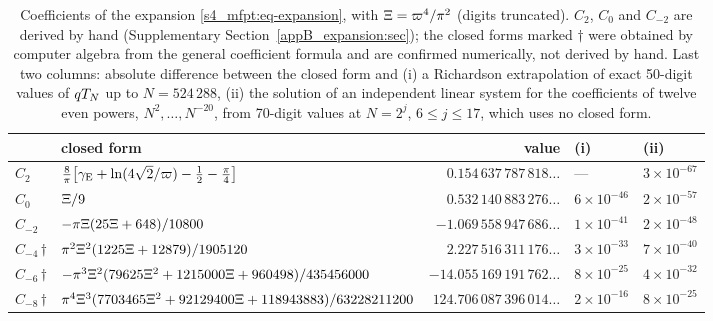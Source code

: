 \begin{table}[htb]
\centering\footnotesize\setlength{\tabcolsep}{3.5pt}
\caption{Coefficients of the expansion \eqref{s4_mfpt:eq-expansion}, with $\Xi=\varpi^{4}/\pi^{2}$ (digits
truncated). $C_{2}$, $C_{0}$ and $C_{-2}$ are derived by hand (Supplementary Section~\ref{appB_expansion:sec}); the closed
forms marked $\dagger$ were obtained by computer algebra from the general coefficient formula and are confirmed
numerically, not derived by hand. Last two columns: absolute difference between the closed form and (i) a Richardson
extrapolation of exact 50-digit values of $qT_{N}$ up to $N=524\,288$, (ii) the solution of an independent linear system
for the coefficients of twelve even powers, $N^{2},\dots,N^{-20}$, from 70-digit values at $N=2^{j}$, $6\le j\le17$,
which uses no closed form.}
\label{s4_mfpt:tab-coeff}
\begin{tabular}{@{}llrll@{}}
\toprule
 & closed form & value & (i) & (ii)\\
\midrule
$C_{2}$ & $\frac8\pi\bigl[\gamma_{\mathrm{E}}+\ln(4\sqrt2/\varpi)-\frac12-\frac\pi4\bigr]$ & $0.154\,637\,787\,818\ldots$ & --- & $3\times10^{-67}$\\[2pt]
$C_{0}$ & $\Xi/9$ & $0.532\,140\,883\,276\ldots$ & $6\times10^{-46}$ & $2\times10^{-57}$\\[2pt]
$C_{-2}$ & $-\pi\Xi(25\Xi+648)/10800$ & $-1.069\,558\,947\,686\ldots$ & $1\times10^{-41}$ & $2\times10^{-48}$\\[2pt]
$C_{-4}$\,$\dagger$ & $\pi^{2}\Xi^{2}(1225\Xi+12879)/1905120$ & $2.227\,516\,311\,176\ldots$ & $3\times10^{-33}$ & $7\times10^{-40}$\\[2pt]
$C_{-6}$\,$\dagger$ & $-\pi^{3}\Xi^{2}(79625\Xi^{2}+1215000\Xi+960498)/435456000$ & $-14.055\,169\,191\,762\ldots$ & $8\times10^{-25}$ & $4\times10^{-32}$\\[2pt]
$C_{-8}$\,$\dagger$ & $\pi^{4}\Xi^{3}(7703465\Xi^{2}+92129400\Xi+118943883)/63228211200$ & $124.706\,087\,396\,014\ldots$ & $2\times10^{-16}$ & $8\times10^{-25}$\\
\bottomrule
\end{tabular}
\end{table}
